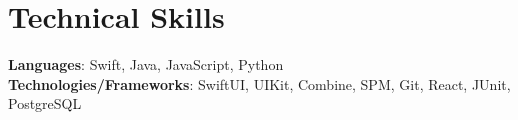 \documentclass[letterpaper,11pt]{article}
\makeatletter
\newcommand{\resumeItem}[1]{
  \item\small{
    {#1 \vspace{-2pt}}
  }
}
\newcommand{\resumeSubheading}[4]{
  \vspace{-2pt}\item
    \begin{tabular*}{1.0\textwidth}[t]{l@{\extracolsep{\fill}}r}
      \textbf{#1} & \textbf{\small #2} \\
      \textit{\small#3} & \textit{\small #4} \\
    \end{tabular*}\vspace{-7pt}
}
\newcommand{\resumeSubHeadingListStart}{\begin{itemize}[leftmargin=0.0in, label={}]}
\newcommand{\resumeSubHeadingListEnd}{\end{itemize}}
\newcommand{\resumeItemListStart}{\begin{itemize}}
\newcommand{\resumeItemListEnd}{\end{itemize}\vspace{-5pt}}
\makeatother
\begin{document}
%
\section{Technical Skills}
 \begin{itemize}[leftmargin=0.15in, label={}]
    \small{\item{
     \textbf{Languages}{: Swift, Java, JavaScript, Python} \\
     \textbf{Technologies/Frameworks}{: SwiftUI, UIKit, Combine, SPM, Git, React, JUnit, PostgreSQL} \\
    }}
 \end{itemize}
 \vspace{-16pt}


        
\end{document}
